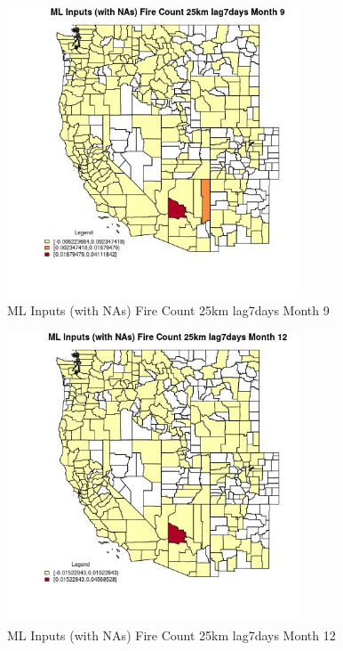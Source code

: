 \begin{figure} 
\centering  
\includegraphics[width=0.77\textwidth]{Code_Outputs/Report_ML_input_PM25_Step4_part_e_de_duplicated_aves_compiled_2019-05-20wNAs_CountyFire_Count_25km_lag7daysmedianMonth9.jpg} 
\caption{\label{fig:Report_ML_input_PM25_Step4_part_e_de_duplicated_aves_compiled_2019-05-20wNAsCountyFire_Count_25km_lag7daysmedianMonth9}ML Inputs (with NAs) Fire Count 25km lag7days Month 9} 
\end{figure} 
 

\begin{figure} 
\centering  
\includegraphics[width=0.77\textwidth]{Code_Outputs/Report_ML_input_PM25_Step4_part_e_de_duplicated_aves_compiled_2019-05-20wNAs_CountyFire_Count_25km_lag7daysmedianMonth12.jpg} 
\caption{\label{fig:Report_ML_input_PM25_Step4_part_e_de_duplicated_aves_compiled_2019-05-20wNAsCountyFire_Count_25km_lag7daysmedianMonth12}ML Inputs (with NAs) Fire Count 25km lag7days Month 12} 
\end{figure} 
 

